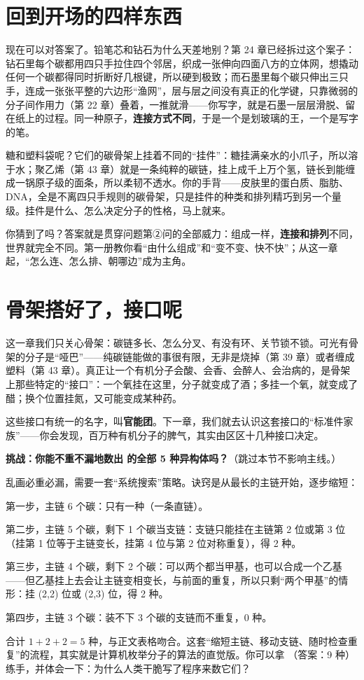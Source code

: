 \section{回到开场的四样东西}

现在可以对答案了。铅笔芯和钻石为什么天差地别？第 24 章已经拆过这个案子：钻石里每个碳都用四只手拉住四个邻居，织成一张伸向四面八方的立体网，想撬动任何一个碳都得同时折断好几根键，所以硬到极致；而石墨里每个碳只伸出三只手，连成一张张平整的六边形“渔网”，层与层之间没有真正的化学键，只靠微弱的分子间作用力（第 22 章）叠着，一推就滑——你写字，就是石墨一层层滑脱、留在纸上的过程。同一种原子，\textbf{连接方式不同}，于是一个是划玻璃的王，一个是写字的笔。

糖和塑料袋呢？它们的碳骨架上挂着不同的“挂件”：糖挂满亲水的小爪子，所以溶于水；聚乙烯（第 43 章）就是一条纯粹的碳链，挂上成千上万个氢，链长到能缠成一锅原子级的面条，所以柔韧不透水。你的手背——皮肤里的蛋白质、脂肪、DNA，全是不离四只手规则的碳骨架，只是挂件的种类和排列精巧到另一个量级。挂件是什么、怎么决定分子的性格，马上就来。

你猜到了吗？答案就是贯穿问题第②问的全部威力：组成一样，\textbf{连接和排列}不同，世界就完全不同。第一册教你看“由什么组成”和“变不变、快不快”；从这一章起，“怎么连、怎么排、朝哪边”成为主角。

\section{骨架搭好了，接口呢}

这一章我们只关心骨架：碳链多长、怎么分叉、有没有环、关节锁不锁。可光有骨架的分子是“哑巴”——纯碳链能做的事很有限，无非是烧掉（第 39 章）或者缠成塑料（第 43 章）。真正让一个有机分子会酸、会香、会醉人、会治病的，是骨架上那些特定的“接口”：一个氧挂在这里，分子就变成了酒；多挂一个氧，就变成了醋；换个位置挂氮，又可能变成某种药。

这些接口有统一的名字，叫\textbf{官能团}。下一章，我们就去认识这套接口的“标准件家族”——你会发现，百万种有机分子的脾气，其实由区区十几种接口决定。

\begin{tiaozhan}
\textbf{挑战：你能不重不漏地数出  的全部 5 种异构体吗？}（跳过本节不影响主线。）

乱画必重必漏，需要一套“系统搜索”策略。诀窍是从最长的主链开始，逐步缩短：

第一步，主链 6 个碳：只有一种（一条直链）。

第二步，主链 5 个碳，剩下 1 个碳当支链：支链只能挂在主链第 2 位或第 3 位（挂第 1 位等于主链变长，挂第 4 位与第 2 位对称重复），得 2 种。

第三步，主链 4 个碳，剩下 2 个碳：可以两个都当甲基，也可以合成一个乙基——但乙基挂上去会让主链变相变长，与前面的重复，所以只剩“两个甲基”的情形：挂 (2,2) 位或 (2,3) 位，得 2 种。

第四步，主链 3 个碳：装不下 3 个碳的支链而不重复，0 种。

合计 $1+2+2=5$ 种，与正文表格吻合。这套“缩短主链、移动支链、随时检查重复”的流程，其实就是计算机枚举分子的算法的直觉版。你可以拿 （答案：9 种）练手，并体会一下：为什么人类干脆写了程序来数它们？
\end{tiaozhan}

